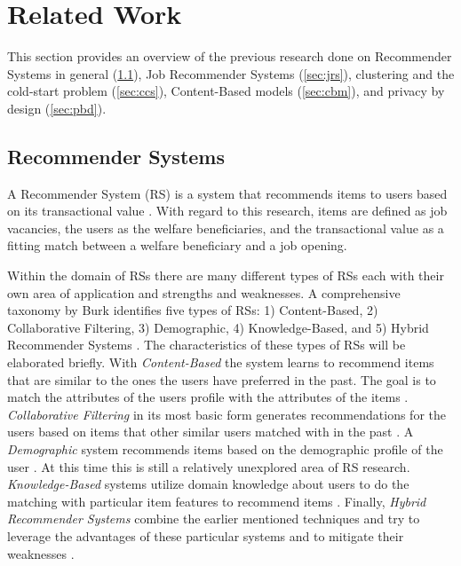 \section{Related Work}
\label{sec:rel}

This section provides an overview of the previous research done on Recommender Systems in general (\ref{sec:rs}), Job Recommender Systems (\ref{sec:jrs}), clustering and the cold-start problem (\ref{sec:ccs}), Content-Based models (\ref{sec:cbm}), and privacy by design (\ref{sec:pbd}).

\subsection{Recommender Systems}
\label{sec:rs}
A Recommender System (RS) is a system that recommends items to users based on its transactional value \cite{aggarwal2016recommender}. With regard to this research, items are defined as job vacancies, the users as the welfare beneficiaries, and the transactional value as a fitting match between a welfare beneficiary and a job opening.

Within the domain of RSs there are many different types of RSs each with their own area of application and strengths and weaknesses.
A comprehensive taxonomy by Burk identifies five types of RSs: 1) Content-Based, 2) Collaborative Filtering, 3) Demographic, 4) Knowledge-Based, and 5) Hybrid Recommender Systems \cite{Burke2007HybridSystems}.
The characteristics of these types of RSs will be elaborated briefly.
With \textit{Content-Based} the system learns to recommend items that are similar to the ones the users have preferred in the past. 
The goal is to match the attributes of the users profile with the attributes of the items  \cite{aggarwal2016recommender}. 
\textit{Collaborative Filtering} in its most basic form generates recommendations for the users based on items that other similar users matched with in the past \cite{Schafer2007}.
A \textit{Demographic} system recommends items based on the demographic profile of the user \cite{Bobadilla2013RecommenderSurvey}.
At this time this is still a relatively unexplored area of RS research. \textit{Knowledge-Based} systems utilize domain knowledge about users to do the matching with particular item features to recommend items  \cite{aggarwal2016recommender}. 
Finally, \textit{Hybrid Recommender Systems} combine the earlier mentioned techniques and try to leverage the advantages of these particular systems and to mitigate their weaknesses  \cite{aggarwal2016recommender}.

